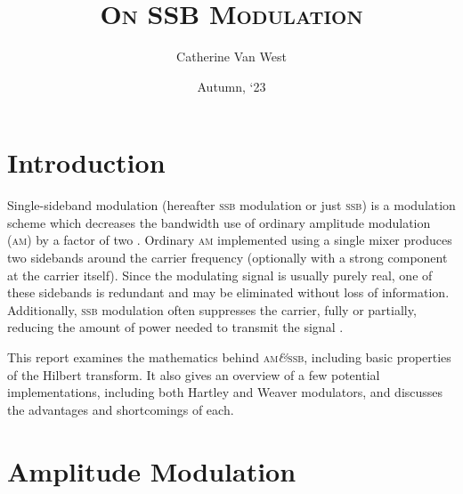 \documentclass[12pt]{article}
\title{\textsc{On SSB Modulation}}
\author{Catherine Van West}
\date{Autumn, `23}
\newcommand{\amp}{\textit{\&}\xspace}
\newcommand{\am}{\textsc{am}\xspace}
\newcommand{\ssb}{\textsc{ssb}\xspace}
\begin{document}
\maketitle

\section{Introduction}
Single-sideband modulation (hereafter \ssb modulation or just \ssb) is a
modulation scheme which decreases the bandwidth use of ordinary amplitude
modulation (\am) by a factor of two \autocite{ssb-thaddeus}. Ordinary \am
implemented using a single mixer produces two sidebands around the carrier
frequency (optionally with a strong component at the carrier itself). Since the
modulating signal is usually purely real, one of these sidebands is redundant
and may be eliminated without loss of information. Additionally, \ssb
modulation often suppresses the carrier, fully or partially, reducing the
amount of power needed to transmit the signal \autocite{weaver-rowell}.

This report examines the mathematics behind \am \amp \ssb, including basic
properties of the Hilbert transform. It also gives an overview of a few
potential implementations, including both Hartley and Weaver modulators, and
discusses the advantages and shortcomings of each.

\section{Amplitude Modulation}


\printbibliography
\end{document}
